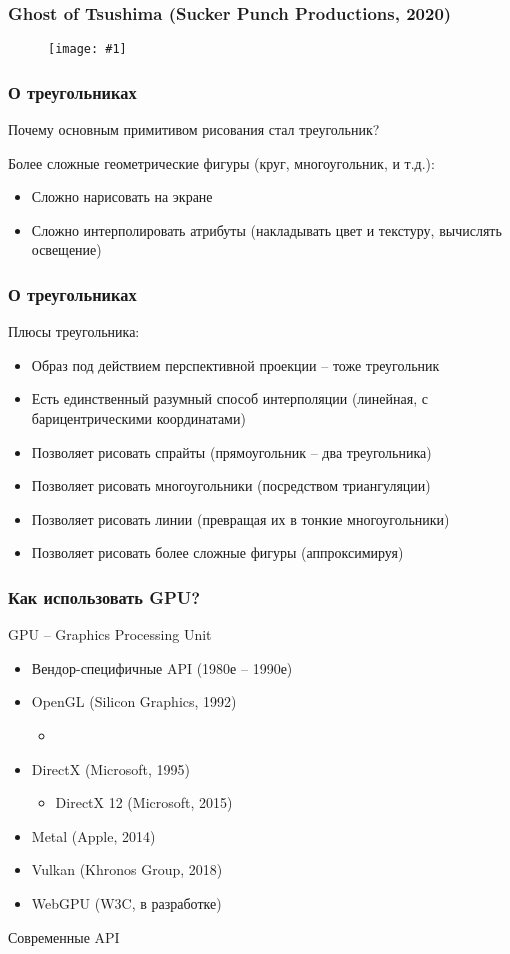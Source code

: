 \documentclass{beamer}
\newcommand{\slideimage}[1]{
  \begin{figure}
    \begin{adjustbox}{width=\textwidth, totalheight=\textheight-2\baselineskip-2\baselineskip,keepaspectratio}
      \texttt{[image: \#1]}
    \end{adjustbox}
  \end{figure}
}
\begin{document}
\begin{frame}
\frametitle{Ghost of Tsushima (Sucker Punch Productions, 2020)}
\slideimage{ghost.jpg}
\end{frame}

\begin{frame}
\frametitle{О треугольниках}
Почему основным примитивом рисования стал треугольник?
\pause

Более сложные геометрические фигуры (круг, многоугольник, и т.д.):
\pause
\begin{itemize}
\item Сложно нарисовать на экране
\pause
\item Сложно интерполировать атрибуты (накладывать цвет и текстуру, вычислять освещение)
\end{itemize}
\end{frame}

\begin{frame}
\frametitle{О треугольниках}
Плюсы треугольника:
\pause
\begin{itemize}
\item Образ под действием перспективной проекции -- тоже треугольник
\pause
\item Есть единственный разумный способ интерполяции (линейная, с барицентрическими координатами)
\pause
\item Позволяет рисовать спрайты (прямоугольник -- два треугольника)
\pause
\item Позволяет рисовать многоугольники (посредством триангуляции)
\pause
\item Позволяет рисовать линии (превращая их в тонкие многоугольники)
\pause
\item Позволяет рисовать более сложные фигуры (аппроксимируя)
\end{itemize}
\end{frame}

\begin{frame}
\frametitle{Как использовать GPU? }
GPU -- Graphics Processing Unit
\pause
\pause
\begin{itemize}
\item Вендор-специфичные API (1980е -- 1990е)
\pause
\item OpenGL (Silicon Graphics, 1992)
\pause
\begin{itemize}
\item {}
\end{itemize}
\pause
\item DirectX (Microsoft, 1995)
\pause
\begin{itemize}
\item {DirectX 12 (Microsoft, 2015)}
\end{itemize}
\pause
\item {\only<11->{\color{red}}Metal (Apple, 2014)}
\pause
\item {Vulkan (Khronos Group, 2018)}
\pause
\item {WebGPU (W3C, в разработке)}
\end{itemize}
\pause
\bigskip
{\color{red}Современные API}
\end{frame}
\end{document}
